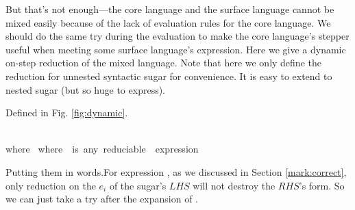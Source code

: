 But that's not enough---the core language and the surface language cannot be mixed easily because of the lack of evaluation rules for the core language. We should do the same try during the evaluation to make the core language's stepper useful when meeting some surface language's expression. Here we give a dynamic on-step reduction of the mixed language. Note that here we only define the reduction for unnested syntactic sugar for convenience. It is easy to extend to nested sugar (but so huge to express). 

\begin{Def} Defined in Fig.  \ref{fig:dynamic}.
\end{Def}
\begin{figure*}[t]\footnotesize
{}
{}
{\\where~}
{}
{}
{}
\footnotesize{where~~is~any~reduciable~~expression}
\caption{Dynamic Reduction}
\label{fig:dynamic}
\end{figure*}

Putting them in words.For expression , as we discussed in Section \ref{mark:correct}, only reduction on the $e_i$ of the sugar's $LHS$ will not destroy the $RHS$'s form. So we can just take a try after the expansion of . 

